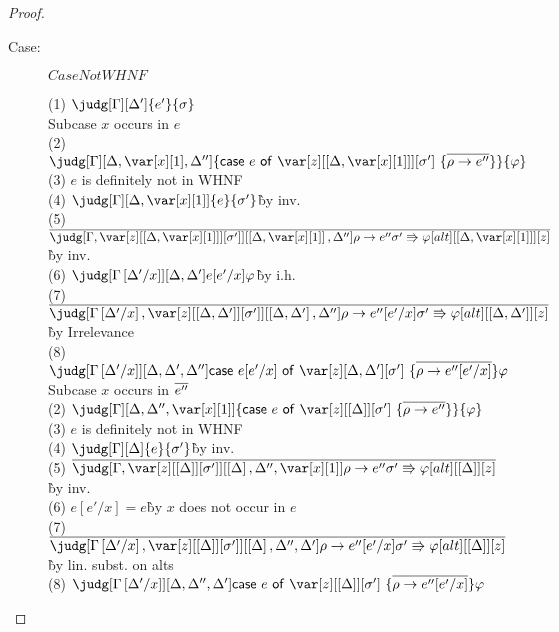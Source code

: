 \begin{proof}
\begin{description}
\item[Case:] $CaseNotWHNF$
\begin{tabbing}
  (1) $\judg[\G][\D']{e'}{\s}$\\
  Subcase $x$ occurs in $e$\\
    (2) $\judg[\G][\D,\xl,\D'']{\ccase{e}{\z[\irr{\D,\xl}][\s']~\{\ov{\rho\to e''}\}}}{\vp}$\\
    (3) $e$ is definitely not in WHNF\\
    (4) $\judg[\G][\D,\xl]{e}{\s'}$\`by inv.\\
    (5) $\ov{\judg[\G,\zr{\irr{\D,\xl}}{\s'}][\irr{\D,\xl},\D'']{\rho\to e''}{\s' \Rrightarrow \vp}[alt][\irr{\D,\xl}][z]}$\`by inv.\\
    (6) $\judg[\subst{\G}{\D'}{x}][\D,\D']{e[e'/x]}{\vp}$\`by i.h.\\
    (7) $\ov{\judg[\subst{\G}{\D'}{x},\zr{\irr{\D,\D'}}{\s'}][\irr{\D,\D'},\D'']{\rho\to e''[e'/x]}{\s' \Rrightarrow \vp}[alt][\irr{\D,\D'}][z]}$ \` by Irrelevance\\
    (8) $\judg[\subst{\G}{\D'}{x}][\D,\D',\D'']{\ccase{e[e'/x]}{\z[\D,\D'][\s']~\{\ov{\rho\to e''[e'/x]}\}}}{\vp}$\\
  Subcase $x$ occurs in $\overline{e''}$\\
    (2) $\judg[\G][\D,\D'',\xl]{\ccase{e}{\z[\irr{\D}][\s']~\{\ov{\rho\to e''}\}}}{\vp}$\\
    (3) $e$ is definitely not in WHNF\\
    (4) $\judg[\G][\D]{e}{\s'}$\`by inv.\\
    (5) $\ov{\judg[\G,\zr{\irr{\D}}{\s'}][\irr{\D},\D'',\xl]{\rho\to e''}{\s' \Rrightarrow \vp}[alt][\irr{\D}][z]}$\`by inv.\\
    (6) $e[e'/x] = e$\` by $x$ does not occur in $e$\\
    (7) $\ov{\judg[\subst{\G}{\D'}{x},\zr{\irr{\D}}{\s'}][\irr{\D},\D'',\D']{\rho\to e''[e'/x]}{\s' \Rrightarrow \vp}[alt][\irr{\D}][z]}$\`by lin. subst. on alts\\
    (8) $\judg[\subst{\G}{\D'}{x}][\D,\D'',\D']{\ccase{e}{\z[\irr{\D}][\s']~\{\ov{\rho\to e''[e'/x]}\}}}{\vp}$\\
\end{tabbing}



\end{description}
\end{proof}

